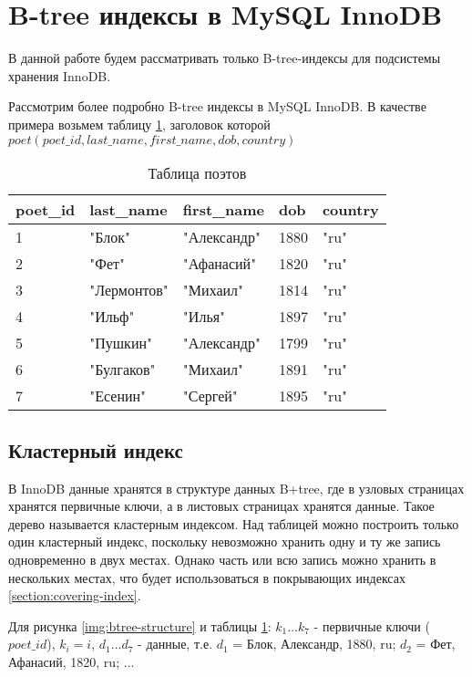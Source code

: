 \section{B-tree индексы в MySQL InnoDB}
\label{section:b-tree-indexes-innodb}

В данной работе будем рассматривать только B-tree-индексы для подсистемы хранения InnoDB.

Рассмотрим более подробно B-tree индексы в MySQL InnoDB. В качестве примера возьмем таблицу \ref{tabular:poets}, заголовок которой $poet (poet\_id, last\_name, first\_name, dob, country)$

\begin{table}[h]
\caption{Таблица поэтов}
\label{tabular:poets}
\medskip
\begin{tabular}{|l|l|l|l|l|}
\hline
poet\_id & last\_name & first\_name & dob & country\\
\hline
1 & "Блок" & "Александр" & 1880 & "ru"\\
2 & "Фет" & "Афанасий" & 1820 & "ru"\\
3 & "Лермонтов" & "Михаил" & 1814 & "ru"\\
4 & "Ильф" & "Илья" & 1897 & "ru"\\
5 & "Пушкин" & "Александр" & 1799 & "ru"\\
6 & "Булгаков" & "Михаил" & 1891 & "ru"\\
7 & "Есенин" & "Сергей" & 1895 & "ru"\\
\hline
\end{tabular}
\end{table}

\subsection{Кластерный индекс}

В InnoDB данные хранятся в структуре данных B+tree, где в узловых страницах хранятся первичные ключи, а в листовых страницах хранятся данные. Такое дерево называется кластерным индексом. Над таблицей можно построить только один кластерный индекс, поскольку невозможно хранить одну и ту же запись одновременно в двух местах. Однако часть или всю запись можно хранить в нескольких местах, что будет использоваться в покрывающих индексах \ref{section:covering-index}.

Для рисунка \ref{img:btree-structure} и таблицы \ref{tabular:poets}: $k_1 \ldots k_7$ - первичные ключи ($poet\_id$), $k_i = i$, $d_1 \ldots d_7$ - данные, т.е. $d_1$ = Блок, Александр, 1880, ru; $d_2$ = Фет, Афанасий, 1820, ru; $\ldots$


